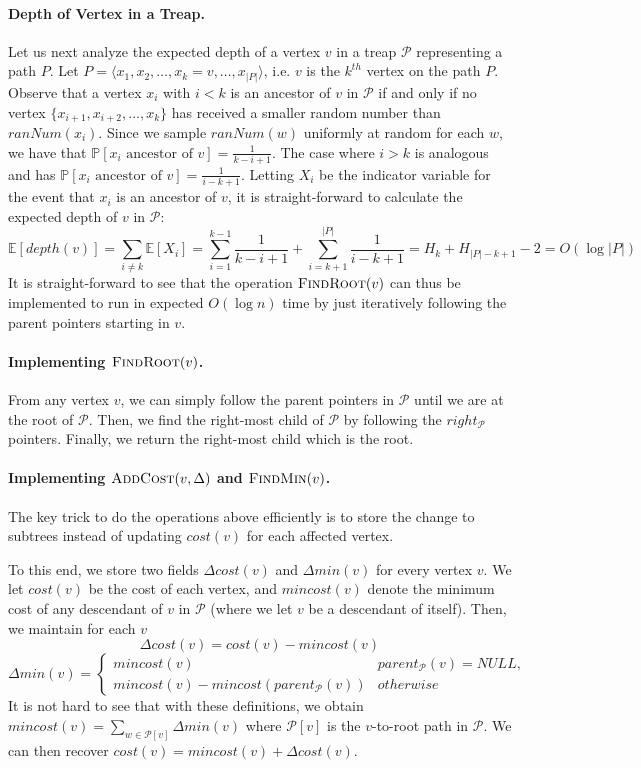 \paragraph{Depth of Vertex in a Treap.} Let us next analyze the expected depth of a vertex $v$ in a treap $\mathcal{P}$ representing a path $P$. Let $P = \langle x_1, x_2, \dots, x_k = v, \dots, x_{|P|}\rangle$, i.e. $v$ is the $k^{th}$ vertex on the path $P$. Observe that a vertex $x_i$ with $i < k$ is an ancestor of $v$ in $\mathcal{P}$ if and only if no vertex $\{x_{i+1}, x_{i+2}, \dots, x_k\}$ has received a smaller random number than $ranNum(x_i)$. Since we sample $ranNum(w)$ uniformly at random for each $w$, we have that $\mathbb{P}[x_i \text{ ancestor of } v] = \frac{1}{k-i+1}$. The case where $i > k$ is analogous and has $\mathbb{P}[x_i \text{ ancestor of } v] = \frac{1}{i-k+1}$. Letting $X_i$ be the indicator variable for the event that $x_i$ is an ancestor of $v$, it is straight-forward to calculate the expected depth of $v$ in $\mathcal{P}$:
\[
    \mathbb{E}[depth(v)] = \sum_{i \neq k} \mathbb{E}[X_i] =  \sum_{i = 1}^{k-1}\frac{1}{k-i+1} + \sum_{i = k+1}^{|P|} \frac{1}{i-k+1} = H_k + H_{|P|-k+1} - 2 = O(\log |P|)
\]
It is straight-forward to see that the operation $\textsc{FindRoot}(v)$ can thus be implemented to run in expected $O(\log n)$ time by just iteratively following the parent pointers starting in $v$.

\paragraph{Implementing $\textsc{FindRoot}(v)$.} From any vertex $v$, we can simply follow the parent pointers in $\mathcal{P}$ until we are at the root of $\mathcal{P}$. Then, we find the right-most child of $\mathcal{P}$ by following the $right_{\mathcal{P}}$ pointers. Finally, we return the right-most child which is the root.

\paragraph{Implementing $\textsc{AddCost}(v, \Delta)$ and $\textsc{FindMin}(v)$.} The key trick to do the operations above efficiently is to store the change to subtrees instead of updating $cost(v)$ for each affected vertex. 

To this end, we store two fields $\Delta cost(v)$ and $\Delta min(v)$ for every vertex $v$. We let $cost(v)$ be the cost of each vertex, and $mincost(v)$ denote the minimum cost of any descendant of $v$ in $\mathcal{P}$ (where we let $v$ be a descendant of itself). Then, we maintain for each $v$
\[
    \Delta cost(v) = cost(v) - mincost(v)
\]
\[
    \Delta min(v) = \begin{cases}
    mincost(v) & parent_{\mathcal{P}}(v) = NULL, \\
    mincost(v) - mincost(parent_{\mathcal{P}}(v)) & otherwise\end{cases}
\]
It is not hard to see that with these definitions, we obtain $mincost(v) = \sum_{w \in \mathcal{P}[v]} \Delta min(v)$ where $\mathcal{P}[v]$ is the $v$-to-root path in $\mathcal{P}$. We can then recover $cost(v) = mincost(v) + \Delta cost(v)$. 


